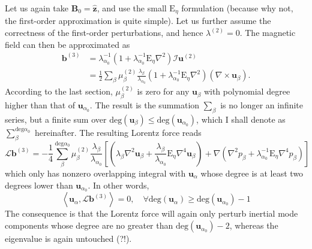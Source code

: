 Let us again take $\mathbf{B}_0 = \hat{\mathbf{z}}$, and use the small $\mathrm{E}_\eta$ formulation (because why not, the first-order approximation is quite simple). Let us further assume the correctness of the first-order perturbations, and hence $\lambda^{(2)} = 0$. The magnetic field can then be approximated as
%
\begin{equation}
\begin{aligned}
    \mathbf{b}^{(3)} &= \lambda_{\alpha_0}^{-1} \left(1 + \lambda_{\alpha_0}^{-1} \mathrm{E}_\eta \nabla^2\right) \mathcal{I} \mathbf{u}^{(2)} \\ 
    &= \frac{1}{2} \sum_\beta \mu_{\beta}^{(2)} \frac{\lambda_\beta}{\lambda_{\alpha_0}} \left(1 + \lambda_{\alpha_0}^{-1} \mathrm{E}_\eta \nabla^2\right) (\nabla\times \mathbf{u}_\beta).
\end{aligned}
\end{equation}
%
According to the last section, $\mu_\beta^{(2)}$ is zero for any $\mathbf{u}_\beta$ with polynomial degree higher than that of $\mathbf{u}_{\alpha_0}$. The result is the summation $\sum_\beta$ is no longer an infinite series, but a finite sum over $\mathrm{deg}(\mathbf{u}_\beta) \leq \mathrm{deg}(\mathbf{u}_{\alpha_0})$, which I shall denote as $\sum_\beta^{\mathrm{deg}\alpha_0}$ hereinafter.
The resulting Lorentz force reads
%
\begin{equation}
    \mathcal{L} \mathbf{b}^{(3)} = - \frac{1}{4} \sum_{\beta}^{\mathrm{deg}\alpha_0} \mu_\beta^{(2)} \frac{\lambda_\beta}{\lambda_{\alpha_0}} \left[\left(\lambda_\beta \nabla^2 \mathbf{u}_\beta + \frac{\lambda_\beta}{\lambda_{\alpha_0}}\mathrm{E}_\eta \nabla^4 \mathbf{u}_\beta\right) + \nabla \left(\nabla^2 p_\beta + \lambda_{\alpha_0}^{-1} \mathrm{E}_\eta \nabla^4 p_\beta\right)\right]
\end{equation}
%
which only has nonzero overlapping integral with $\mathbf{u}_{\alpha}$ whose degree is at least two degrees lower than $\mathbf{u}_{\alpha_0}$. In other words,
%
\begin{equation}
    \left\langle \mathbf{u}_{\alpha}, \mathcal{L} \mathbf{b}^{(3)} \right\rangle = 0, \quad \forall \mathrm{deg}(\mathbf{u}_\alpha) \geq \mathrm{deg}(\mathbf{u}_{\alpha_0})-1
\end{equation}
%
The consequence is that the Lorentz force will again only perturb inertial mode components whose degree are no greater than $\mathrm{deg}(\mathbf{u}_{\alpha_0})-2$, whereas the eigenvalue is again untouched (?!). 


